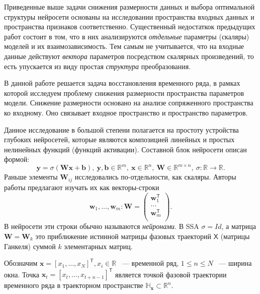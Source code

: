 \documentclass[12pt, twoside]{article}
\begin{document}
Приведенные выше задачи снижения размерности данных и выбора оптимальной структуры нейросети основаны на исследовании пространства входных данных и пространства признаков соответственно. Существенный недостаткок предыдущих работ состоит в том, что в них анализируются \textit{отдельные} параметры (скаляры) моделей и их взаимозависимость. Тем самым не учитывается, что на входные данные действуют \textit{вектора} параметров посредством скалярных произведений, то есть упускается из виду простая \textit{структура} преобразования.

В данной работе решается задача восстановления временного ряда, в рамках которой исследуем проблему снижения размерности пространства параметров модели. Снижение размерности основано на анализе сопряженного пространства ко входному. Оно связывает входное пространство и пространство параметров. 



Данное исследование в большой степени полагается на простоту устройства глубоких нейросетей, которые являются композицией линейных и простых нелинейных функций (функций активации). Составной блок нейросети описан формой:  \[\mathbf{y}=\sigma(\mathbf{W}\mathbf{x} + \mathbf{b}), \ \mathbf{y}, \mathbf{b} \in \mathbb{R}^m, \ \mathbf{x} \in \mathbb{R}^n, \ \mathbf{W} \in \mathbb{R}^{m \times n}, \ \sigma: \mathbb{R} \to \mathbb{R}.\] Раньше элементы $\mathbf{W}_{ij}$ исследовались по-отдельности, как скаляры. Авторы работы предлагают изучать их как векторы-строки \[\mathbf{w}_1, \dots, \mathbf{w}_m: \mathbf{W} = \begin{pmatrix}
\mathbf{w}_1^{\mathsf{T}}\\
\dots\\
\mathbf{w}_m^{\mathsf{T}}\\
\end{pmatrix}.\] В нейросети эти строки обычно называются \textit{нейронами}. В SSA $\sigma = Id$, а матрица $\mathbf{W}=\mathbf{W}_k$ это приближение истинной матрицы фазовых траекторий $\mathsf{X}$ (матрицы Ганкеля) суммой $k$ элементарных матриц.


Обозначим $\mathbf{x} = [x_1, \dots, x_N]^{\mathsf{T}}, x_i \in \mathbb{R}$ ~--- временной ряд, $1 \le n \le N$ ~--- ширина окна. Точка $\mathbf{x}_t = [x_t, \dots, x_{t + n - 1}]^{\mathsf{T}}$ является точкой фазовой траектории временного ряда в траекторном пространстве $\mathbb{H}_{\mathbf{x}} \subset \mathbb{R}^n$. 
\end{document}
